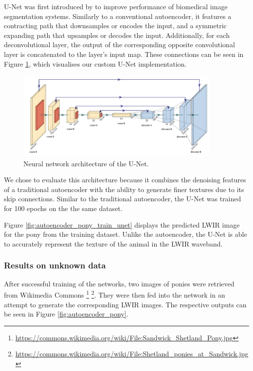 \documentclass{l4proj}
\begin{document}
U-Net was first introduced by \citet{ronneberger_u-net_2015} to improve performance of biomedical image segmentation systems. Similarly to a conventional autoencoder, it features a contracting path that downsamples or encodes the input, and a symmetric expanding path that upsamples or decodes the input. Additionally, for each deconvolutional layer, the output of the corresponding opposite convolutional layer is concatenated to the layer's input map. These connections can be seen in Figure \ref{fig:unet_architecture}, which visualises our custom U-Net implementation. 

\begin{figure}[ht]
  \centering
  \includegraphics[width=0.9\textwidth]{images/models/unet}
  \caption{Neural network architecture of the U-Net.}
  \label{fig:unet_architecture}
\end{figure}

We chose to evaluate this architecture because it combines the denoising features of a traditional autoencoder with the ability to generate finer textures due to its skip connections. Similar to the traditional autoencoder, the U-Net was trained for 100 epochs on the the same dataset. 

Figure \ref{fig:autoencoder_pony_train_unet} displays the predicted LWIR image for the pony from the training dataset. Unlike the autoencoder, the U-Net is able to accurately represent the texture of the animal in the LWIR waveband.

\subsubsection{Results on unknown data}

After successful training of the networks, two images of ponies were retrieved from Wikimedia Commons \footnote{\url{https://commons.wikimedia.org/wiki/File:Sandwick_Shetland_Pony.jpg}} \footnote{\url{https://commons.wikimedia.org/wiki/File:Shetland_ponies_at_Sandwick.jpg}}. They were then fed into the network in an attempt to generate the corresponding LWIR images. The respective outputs can be seen in Figure \ref{fig:autoencoder_pony}.
\end{document}
